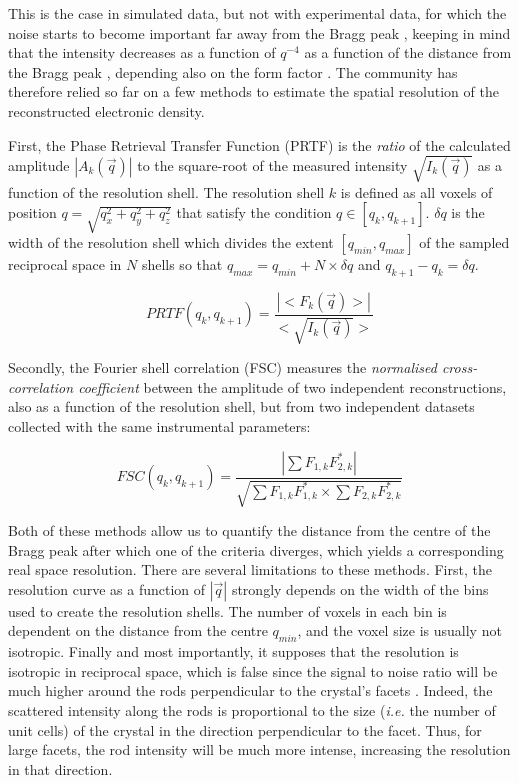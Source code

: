 This is the case in simulated data, but not with experimental data, for which the noise starts to become important far away from the Bragg peak \parencite{Bikondoa2021}, keeping in mind that the intensity decreases as a function of $q^{-4}$ as a function of the distance from the Bragg peak \parencite{Marchesini2003a}, depending also on the form factor \parencite{Croset2017}.
The community has therefore relied so far on a few methods to estimate the spatial resolution of the reconstructed electronic density.

First, the Phase Retrieval Transfer Function (PRTF) \parencite{Chapman2006} is the \textit{ratio} of the calculated amplitude $|A_k(\vec{q})|$ to the square-root of the measured intensity $\sqrt{I_k(\vec{q})}$ as a function of the resolution shell.
The resolution shell $k$ is defined as all voxels of position $q=\sqrt{q_x^2 + q_y^2 +q_z^2}$ that satisfy the condition $q \in [q_k, q_{k+1}]$.
$\delta q$ is the width of the resolution shell which divides the extent $[q_{min}, q_{max}]$ of the sampled reciprocal space in $N$ shells so that $q_{max} = q_{min} + N \times \delta q$ and $q_{k+1} - q_{k} = \delta q$.

\begin{equation}
    PRTF(q_k, q_{k+1}) = \frac{|<F_k(\vec{q})>|}{<\sqrt{I_k(\vec{q})}>}
\end{equation}

Secondly, the Fourier shell correlation (FSC) \parencite{VanHeel2005} measures the \textit{normalised cross-correlation coefficient} between the amplitude of two independent reconstructions, also as a function of the resolution shell, but from two independent datasets collected with the same instrumental parameters:

\begin{equation}
    FSC(q_k, q_{k+1}) = \frac{ |\sum F_{1,k} F_{2,k}^*| }{\sqrt{ \sum F_{1,k} F_{1,k}^* \times \sum F_{2,k} F_{2,k}^*}}
\end{equation}

Both of these methods allow us to quantify the distance from the centre of the Bragg peak after which one of the criteria diverges, which yields a corresponding real space resolution.
There are several limitations to these methods.
First, the resolution curve as a function of $|\vec{q}|$ strongly depends on the width of the bins used to create the resolution shells.
The number of voxels in each bin is dependent on the distance from the centre $q_{min}$, and the voxel size is usually not isotropic.
Finally and most importantly, it supposes that the resolution is isotropic in reciprocal space, which is false since the signal to noise ratio will be much higher around the rods perpendicular to the crystal's facets \parencite{Cherukara2018a}.
Indeed, the scattered intensity along the rods is proportional to the size (\textit{i.e.} the number of unit cells) of the crystal in the direction perpendicular to the facet.
Thus, for large facets, the rod intensity will be much more intense, increasing the resolution in that direction.


